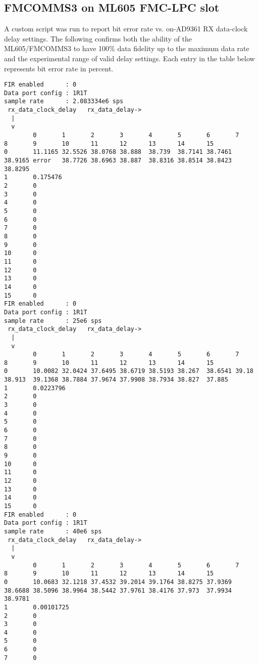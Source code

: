 \documentclass{article}
\begin{document}
\subsection{FMCOMMS3 on ML605 FMC-LPC slot}
A custom script was run to report bit error rate vs. on-AD9361 RX data-clock delay settings. The following confirms both the ability of the ML605/FMCOMMS3 to have 100\% data fidelity up to the maximum data rate and the experimental range of valid delay settings. Each entry in the table below represents bit error rate in percent.
\lstset{language=bash, columns=flexible, prebreak=\textbackslash, basicstyle=\ttfamily, showstringspaces=false,upquote=true, aboveskip=\baselineskip, belowskip=\baselineskip}
\begin{lstlisting}[basicstyle=\scriptsize]
FIR enabled      : 0
Data port config : 1R1T
sample rate      : 2.083334e6 sps
 rx_data_clock_delay   rx_data_delay->
  |
  v
        0       1       2       3       4       5       6       7       8       9       10      11      12      13      14      15
0       11.1165 32.5526 38.0768 38.888  38.739  38.7141 38.7461 38.9165 error   38.7726 38.6963 38.887  38.8316 38.8514 38.8423 38.8295 
1       0.175476        
2       0       
3       0       
4       0       
5       0       
6       0       
7       0       
8       0       
9       0       
10      0       
11      0       
12      0       
13      0       
14      0       
15      0       
FIR enabled      : 0
Data port config : 1R1T
sample rate      : 25e6 sps
 rx_data_clock_delay   rx_data_delay->
  |
  v
        0       1       2       3       4       5       6       7       8       9       10      11      12      13      14      15
0       10.0082 32.0424 37.6495 38.6719 38.5193 38.267  38.6541 39.18   38.913  39.1368 38.7884 37.9674 37.9908 38.7934 38.827  37.885  
1       0.0223796       
2       0       
3       0       
4       0       
5       0       
6       0       
7       0       
8       0       
9       0       
10      0       
11      0       
12      0       
13      0       
14      0       
15      0       
FIR enabled      : 0
Data port config : 1R1T
sample rate      : 40e6 sps
 rx_data_clock_delay   rx_data_delay->
  |
  v
        0       1       2       3       4       5       6       7       8       9       10      11      12      13      14      15
0       10.0683 32.1218 37.4532 39.2014 39.1764 38.8275 37.9369 38.6688 38.5096 38.9964 38.5442 37.9761 38.4176 37.973  37.9934 38.9781 
1       0.00101725      
2       0       
3       0       
4       0       
5       0       
6       0       
7       0       

\end{lstlisting}
\end{document}
